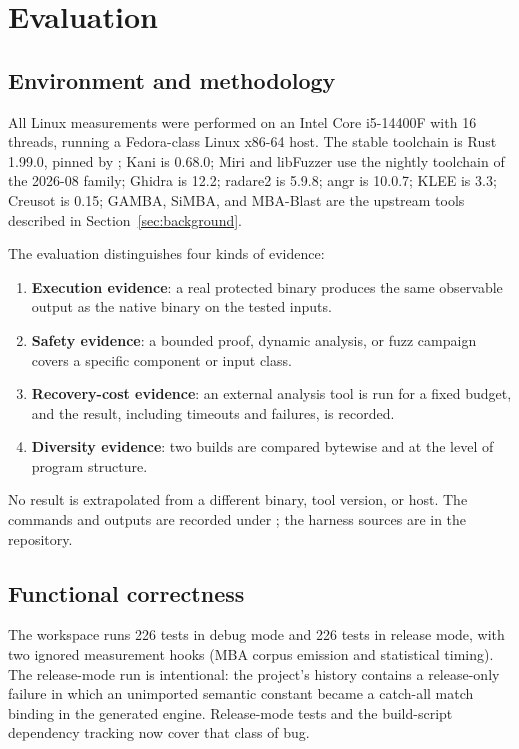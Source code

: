 \section{Evaluation}
\label{sec:evaluation}

\subsection{Environment and methodology}

All Linux measurements were performed on an Intel Core i5-14400F with 16 threads,
running a Fedora-class Linux x86-64 host. The stable toolchain is Rust 1.99.0,
pinned by ; Kani is 0.68.0; Miri and libFuzzer use the
nightly toolchain of the 2026-08 family; Ghidra is 12.2; radare2 is 5.9.8; angr
is 10.0.7; KLEE is 3.3; Creusot is 0.15; GAMBA, SiMBA, and MBA-Blast are the
upstream tools described in Section~\ref{sec:background}.

The evaluation distinguishes four kinds of evidence:

\begin{enumerate}
  \item \textbf{Execution evidence}: a real protected binary produces the same
        observable output as the native binary on the tested inputs.
  \item \textbf{Safety evidence}: a bounded proof, dynamic analysis, or fuzz
        campaign covers a specific component or input class.
  \item \textbf{Recovery-cost evidence}: an external analysis tool is run for a
        fixed budget, and the result, including timeouts and failures, is
        recorded.
  \item \textbf{Diversity evidence}: two builds are compared bytewise and at the
        level of program structure.
\end{enumerate}

No result is extrapolated from a different binary, tool version, or host. The
commands and outputs are recorded under ; the harness
sources are in the repository.

\subsection{Functional correctness}

The workspace runs 226 tests in debug mode and 226 tests in release mode, with
two ignored measurement hooks (MBA corpus emission and statistical timing). The
release-mode run is intentional: the project's history contains a release-only
failure in which an unimported semantic constant became a catch-all match binding
in the generated engine. Release-mode tests and the build-script dependency
tracking now cover that class of bug.

